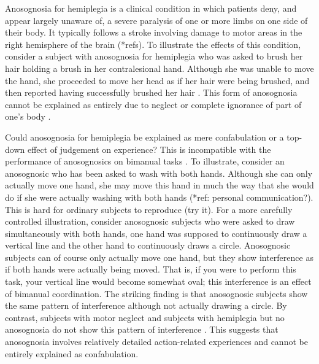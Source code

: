 \documentclass[12pt,\papersize]{extarticle}
\begin{document}
Anosognosia for hemiplegia is a clinical condition in which patients deny, and appear largely unaware of, a severe paralysis of one or more limbs on one side of their body.  It typically follows a stroke involving damage to motor areas in the right hemisphere of the brain (*refs).  To illustrate the effects of this condition, consider a subject with anosognosia for hemiplegia who was asked to brush her hair holding a brush in her contralesional hand.  Although she was unable to move the hand, she proceeded to move her head as if her hair were being brushed, and then reported having successfully brushed her hair \citep{berti:2008_motor}. This form of anosognosia cannot be explained as entirely due to neglect or complete ignorance of part of one's body \citep[p.\ 165]{berti:2008_motor}.  

Could anosognosia for hemiplegia be explained as mere confabulation or a top-down effect of judgement on experience?  This is incompatible with the performance of anosognosics on bimanual tasks \citep{berti:2008_motor, garbarini:2012_moving}.  To illustrate, consider an anosognosic who has been asked to wash with both hands.  Although she can only actually move one hand, she may move this hand in much the way that she would do if she were actually washing with both hands (*ref: personal communication?).  This is hard for ordinary subjects to reproduce (try it). For a more carefully controlled illustration, consider anosognosic subjects who were asked to draw simultaneously with both hands, one hand was supposed to continuously draw a vertical line and the other hand to continuously draws a circle.  Anosognosic subjects can of course only actually move one hand, but they show interference as if both hands were actually being moved.  That is, if you were to perform this task, your vertical line would become somewhat oval; this interference is an effect of bimanual coordination.  The striking finding is that anosognosic subjects show the same pattern of interference although not actually drawing a circle.  By contrast, subjects with motor neglect and subjects with hemiplegia but no anosognosia do not show this pattern of interference \citep{garbarini:2012_moving}.  This suggests that anosognosia involves relatively detailed action-related experiences and cannot be entirely explained as confabulation.  
\end{document}
